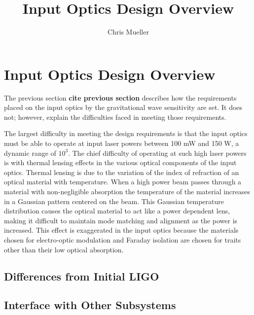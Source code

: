 \documentclass[10pt]{article}
\title{Input Optics Design Overview}
\author{Chris Mueller}
\begin{document}
\section{Input Optics Design Overview}

The previous section \textbf{cite previous section} describes how the requirements placed on the 
input optics by the gravitational wave sensitivity are set.  
It does not; however, explain the difficulties faced in meeting those requirements.  

The largest difficulty in meeting the design requirements is that the input optics 
must be able to operate at input laser powers between 100 mW and 150 W, 
a dynamic range of $10^3$.  
The chief difficulty of operating at such high laser powers is with thermal lensing 
effects in the various optical components of the input optics.  
Thermal lensing is due to the variation of the index of refraction of an optical 
material with temperature.  
When a high power beam passes through a material with non-negligible absorption 
the temperature of the material increases in a Gaussian pattern centered on the beam.  
This Gaussian temperature distribution causes the optical material to act like a power 
dependent lens, making it difficult to maintain mode matching and alignment as the power 
is increased.  
This effect is exaggerated in the input optics because the materials chosen for electro-optic 
modulation and Faraday isolation are chosen for traits other than their low optical absorption.

\subsection{Differences from Initial LIGO}

\subsection{Interface with Other Subsystems}
\end{document}
